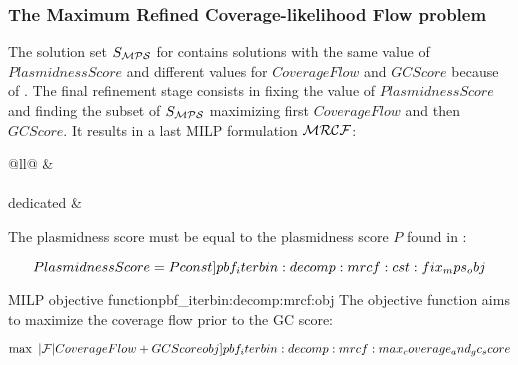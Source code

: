 \subsubsection{The Maximum Refined Coverage-likelihood Flow problem \MRCF{}}\label{sec:pbf_iterbin:decomp:mrcf}

The solution set \(S_{\mathcal{MPS}}{}\) for \MPS{} contains solutions with the same value of \(PlasmidnessScore\) and different values for \(CoverageFlow\) and \(GCScore\) because of .
The final refinement stage consists in fixing the value of \(PlasmidnessScore\) and finding the subset of \(S_{\mathcal{MPS}}{}\) maximizing first \(CoverageFlow\) and then \(GCScore\).
It results in a last MILP formulation \(\mathcal{MRCF}{}\):

\begin{table}[!htbp]
  \centering
  \label{tab:decomp:mrcf:cst}
  \begin{tabular}{@{}ll@{}}
    \toprule
     &  \\
    \midrule
     \\
    \addlinespace
    \MRCF{} dedicated &  \\
    \bottomrule
  \end{tabular}
\end{table}

The plasmidness score must be equal to the plasmidness score \(P\) found in \MPS{}:
\begin{Constraint}
  \begin{equation}
    PlasmidnessScore = P
    \cstlabel{pbf_iterbin:decomp:mrcf:cst:fix_mps_obj} %
  \end{equation}
\end{Constraint}

\begin{definition}{\MRCF{} MILP objective function}{pbf_iterbin:decomp:mrcf:obj}
  The objective function aims to maximize the coverage flow prior to the GC score:
  \begin{Objective}
    \begin{equation}
      \max ~ |\Fragments{}| CoverageFlow + GCScore
      \objlabel{pbf_iterbin:decomp:mrcf:max_coverage_and_gc_score} %
    \end{equation}
  \end{Objective}
\end{definition}
